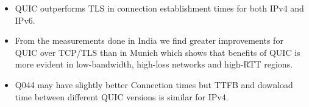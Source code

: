\begin{frame}
    \begin{itemize}
    \itemsep2em

\item QUIC outperforms TLS in connection establishment times for both IPv4 and IPv6.


\item From the measurements done in India we find greater improvements for QUIC over TCP/TLS than in Munich which shows that benefits of QUIC is more evident in low-bandwidth, high-loss networks and high-RTT regions. 


\item Q044 may have slightly better Connection times but TTFB and download time between different QUIC versions is similar for IPv4.




\end{itemize}
\end{frame}
